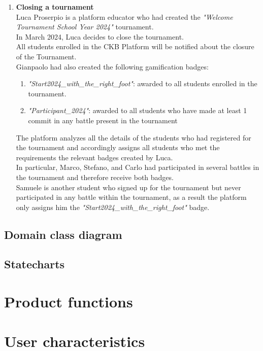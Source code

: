 \begin{enumerate}
\item \textbf{Closing a tournament}\\
Luca Proserpio is a platform educator who had created the \emph{"Welcome Tournament School Year 2024"} tournament.\\
In March 2024, Luca decides to close the tournament.\\
All students enrolled in the CKB Platform will be notified about the closure of the Tournament.\\
Gianpaolo had also created the following gamification badges:
			\begin{enumerate}
				\item \emph{"Start2024_with_the_right_foot"}: awarded to all students enrolled in the tournament.
				\item \emph{"Participant_2024"}: awarded to all students who have made at least 1 commit in any battle present in the tournament
			\end{enumerate}
The platform analyzes all the details of the students who had registered for the tournament and accordingly assigns all students who met the requirements the relevant badges created by Luca.\\
In particular, Marco, Stefano, and Carlo had participated in several battles in the tournament and therefore receive both badges.\\
Samuele is another student who signed up for the tournament but never participated in any battle within the tournament, as a result the platform only assigns him the \emph{"Start2024_with_the_right_foot"} badge.

\end{enumerate}


\subsection{Domain class diagram}

\subsection{Statecharts}




\section{Product functions}



\section{User characteristics}
